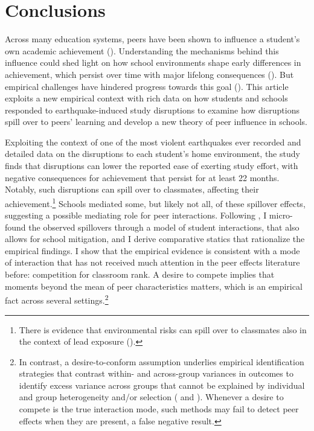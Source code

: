 \section{Conclusions}\label{sec:conclusions}

Across many education systems, peers have been shown to influence a student's own academic achievement (\cite{sacerdote2011peer}). Understanding the mechanisms behind this influence could shed light on how school environments shape early differences in achievement, which persist over time with major lifelong consequences (\cite*{cunha2006interpreting,heckman2014economics}). But empirical challenges have hindered progress towards this goal (\cite*{blume2011identification}). This article exploits a new empirical context with rich data on how students and schools responded to earthquake-induced study disruptions to examine how disruptions spill over to peers' learning and develop a new theory of peer influence in schools.\par 


Exploiting the context of one of the most violent earthquakes ever recorded and detailed data on the disruptions to each student's home environment, the study finds that disruptions can lower the reported ease of exerting study effort, with negative consequences for achievement that persist for at least 22 months. Notably, such disruptions can spill over to classmates, affecting their achievement.\footnote{There is evidence that environmental risks can spill over to classmates also in the context of lead exposure (\cite{gazze2021long}). } Schools mediated some, but likely not all, of these spillover effects, suggesting a possible mediating role for peer interactions. Following \cite*{blume2015linear}, I micro-found the observed spillovers through a model of student interactions, that also allows for school mitigation, and I derive comparative statics that rationalize the empirical findings. I show that the empirical evidence is consistent with a mode of interaction that has not received much attention in the peer effects literature before: competition for classroom rank. A desire to compete implies that moments beyond the mean of peer characteristics matters, which is an empirical fact across several settings.\footnote{In contrast, a desire-to-conform assumption underlies empirical identification strategies that contrast within- and across-group variances in outcomes to identify excess variance across groups that cannot be explained by individual and group heterogeneity and/or selection (\cite{graham2008identifying} and \cite{glaeser1996crime}). Whenever a desire to compete is the true interaction mode, such methods may fail to detect peer effects when they are present, a false negative result.   }\par 









